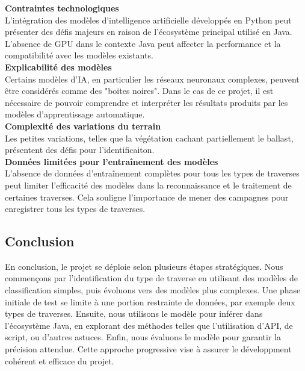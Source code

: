 \noindent \textbf{Contraintes technologiques} \\
L'intégration des modèles d'intelligence artificielle développés en Python peut présenter des défis majeurs en raison de l'écosystème principal utilisé en Java. L'absence de GPU dans le contexte Java peut affecter la performance et la compatibilité avec les modèles existants.\\

\noindent \textbf{Explicabilité des modèles} \\
 Certains modèles d'IA, en particulier les réseaux neuronaux complexes, peuvent être considérés comme des "boites noires". Dans le cas de ce projet, il est nécessaire de pouvoir comprendre et interpréter les résultats produits par les modèles d'apprentissage automatique.\\

\noindent \textbf{Complexité des variations du terrain} \\
Les petites variations, telles que la végétation cachant partiellement le ballast, présentent des défis pour l'identificaiton. \\

\noindent \textbf{Données limitées pour l'entraînement des modèles } \\
L'absence de données d'entraînement complètes pour tous les types de traverses peut limiter l'efficacité des modèles dans la reconnaissance et le traitement de certaines traverses. Cela souligne l'importance de mener des campagnes pour enregistrer tous les types de traverses.



\subsection{Conclusion}
En conclusion, le projet se déploie selon plusieurs étapes stratégiques. Nous commençons par l'identification du type de traverse en utilisant des modèles de classification simples, puis évoluons vers des modèles plus complexes. Une phase initiale de test se limite à une portion restrainte de données, par exemple deux types de traverses. Ensuite, nous utilisons le modèle pour inférer dans l'écosystème Java, en explorant des méthodes telles que l'utilisation d'API, de script, ou d'autres astuces. Enfin, nous évaluons le modèle pour garantir la précision attendue. Cette approche progressive vise à assurer le développment cohérent et efficace du projet. \\

